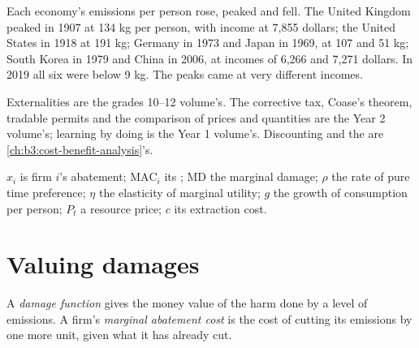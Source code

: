 Each economy's emissions per person rose, peaked and fell. The United Kingdom peaked in 1907 at 134 kg per
person, with income at 7{,}855 dollars; the United States in 1918 at 191 kg; Germany in 1973 and Japan in 1969, at 107
and 51 kg; South Korea in 1979 and China in 2006, at incomes of 6{,}266 and 7{,}271 dollars. In 2019 all six were below 9 kg.
The peaks came at very different incomes.

\begin{recall}
Externalities are the grades 10--12 volume's. The corrective tax, Coase's theorem,
tradable permits and the comparison of prices and quantities are the Year 2
volume's; learning by doing is the Year 1 volume's. Discounting and the  are \cref{ch:b3:cost-benefit-analysis}'s.
\end{recall}

\begin{notation}\label{not:b3:environmental-and-resource-economics:symbols}
$x_i$ is firm $i$'s abatement; $\mathrm{MAC}_i$ its ; $\mathrm{MD}$ the marginal
damage; $\rho$ the rate of pure time preference; $\eta$ the elasticity of marginal utility;
$g$ the growth of consumption per person; $P_t$ a resource price; $c$ its extraction cost.
\end{notation}

\section{Valuing damages}\label{sec:b3:environmental-and-resource-economics:damages}

\begin{definition}\label{def:b3:environmental-and-resource-economics:abatement}
A \emph{damage function} gives the money value of the harm done by a level of
emissions. A firm's \emph{marginal abatement cost} is the cost of cutting its
emissions by one more unit, given what it has already cut.
\end{definition}


